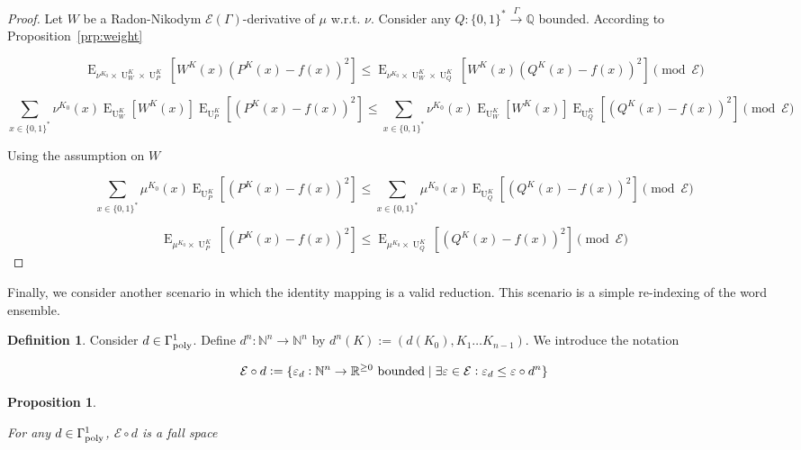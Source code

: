 \documentclass{article}
\numberwithin{equation}{section}
\theoremstyle{definition}
\newtheorem{definition}{Definition}[section]
\theoremstyle{plain}
\newtheorem{proposition}{Proposition}[section]
\newcommand{\Bool}{\{0,1\}}
\newcommand{\Words}{{\Bool^*}}
\DeclareMathOperator{\E}{E}
\DeclareMathOperator{\Un}{U}
\newcommand{\Nats}{\mathbb{N}}
\newcommand{\Rats}{\mathbb{Q}}
\newcommand{\Reals}{\mathbb{R}}
\newcommand{\Fall}{\mathcal{E}}
\newcommand{\EG}{\Fall(\Gamma)}
\newcommand{\Scheme}{\xrightarrow{\Gamma}}
\begin{document}
\begin{proof}

Let ${W}$ be a Radon-Nikodym ${\EG}$-derivative of ${\mu}$ w.r.t. ${\nu}$. Consider any ${Q: \Words \Scheme \Rats}$ bounded. According to Proposition~\ref{prp:weight}

\[\E_{\nu^{K_0} \times \Un_W^K \times \Un_P^K}[W^K(x)(P^K(x)-f(x))^2] \leq \E_{\nu^{K_0} \times \Un_W^K \times \Un_Q^K}[W^K(x)(Q^K(x)-f(x))^2] \pmod \Fall\]

\[\sum_{x \in \Words} \nu^{K_0}(x) \E_{\Un_W^K}[W^K(x)] \E_{\Un_P^K}[(P^K(x)-f(x))^2] \leq \sum_{x \in \Words} \nu^{K_0}(x) \E_{\Un_W^K}[W^K(x)] \E_{\Un_Q^K}[(Q^K(x)-f(x))^2] \pmod \Fall\]

Using the assumption on ${W}$

\[\sum_{x \in \Words} \mu^{K_0}(x) \E_{\Un_P^K}[(P^K(x)-f(x))^2] \leq \sum_{x \in \Words} \mu^{K_0}(x) \E_{\Un_Q^K}[(Q^K(x)-f(x))^2] \pmod \Fall\]

\[\E_{\mu^{K_0} \times \Un_P^K}[(P^K(x)-f(x))^2] \leq \E_{\mu^{K_0} \times \Un_Q^K}[(Q^K(x)-f(x))^2] \pmod \Fall\]
%
\end{proof}

Finally, we consider another scenario in which the identity mapping is a valid reduction. This scenario is a simple re-indexing of the word ensemble.

\begin{samepage}
\begin{definition}

Consider ${d \in \Gamma_{\textnormal{poly}}^1}$. Define ${d^n: \Nats^n \rightarrow \Nats^n}$ by ${d^n(K):=(d(K_0),K_1 \ldots K_{n-1})}$. We introduce the notation

\begin{equation}
\label{eqn:tbd}
\Fall \circ d:=\{\varepsilon_d: \Nats^n \rightarrow \Reals^{\geq 0} \textnormal{ bounded} \mid \exists \varepsilon \in \Fall: \varepsilon_d \leq \varepsilon \circ d^n\}
\end{equation}

\end{definition}
\end{samepage}

\begin{samepage}
\begin{proposition}
\label{prp:tbd}

For any ${d \in \Gamma_{\textnormal{poly}}^1}$, ${\Fall \circ d}$ is a fall space

\end{proposition}
\end{samepage}
\end{document}
